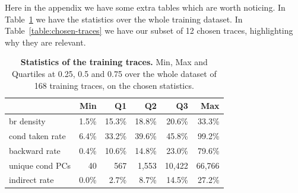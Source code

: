 \documentclass[11pt,a4paper,twocolumn]{article}
\begin{document}
Here in the appendix we have some extra tables which are worth noticing. In Table~\ref{table:traces} we have the statistics over the whole training dataset. In Table~\ref{table:chosen-traces} we have our subset of 12 chosen traces, highlighting why they are relevant.
\begin{table}[tb]
    \caption{\textbf{Statistics of the training traces.} Min, Max and Quartiles at 0.25, 0.5 and 0.75 over the whole dataset of 168 training traces, on the chosen statistics.}
    \centering 
    \begin{tabular}{|lrrrrr|}
    \hline
    \rowcolor{bluePoli!40}
    & \textbf{Min} & \textbf{Q1} & \textbf{Q2} & \textbf{Q3} & \textbf{Max} \\
    \hline \hline
    br density & 1.5\% & 15.3\% & 18.8\% & 20.6\% & 33.3\% \\
    cond taken rate & 6.4\% & 33.2\% & 39.6\% & 45.8\% & 99.2\% \\
    backward rate & 0.4\% & 10.6\% & 14.8\% & 23.0\% & 79.6\% \\
    unique cond PCs & 40 & 567 & 1,553 & 10,422 & 66,766 \\
    indirect rate & 0.0\% & 2.7\% & 8.7\% & 14.5\% & 27.2\% \\
    \hline
    \end{tabular}
    \label{table:traces}
\end{table}
\end{document}
